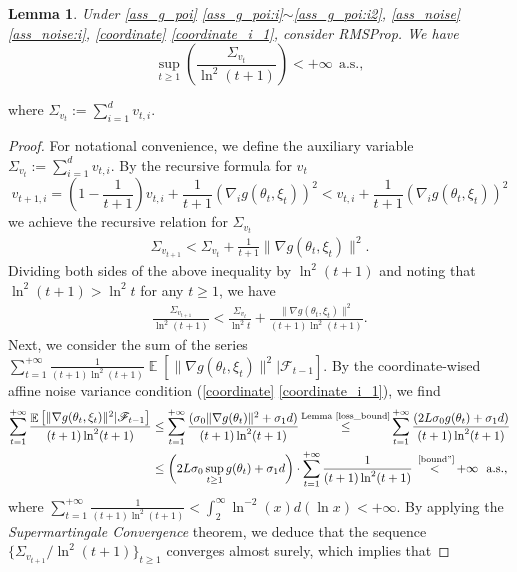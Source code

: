 \documentclass[standalone]{article}
\newtheorem{lem}{Lemma}[section]
\DeclareMathOperator{\Expect}{\mathbb{E}}
\begin{document}
\begin{lem}\label{bounded_v}
Under \cref{ass_g_poi} \ref{ass_g_poi:i}$\sim$\ref{ass_g_poi:i2}, \cref{ass_noise} \ref{ass_noise:i}, \cref{coordinate} \ref{coordinate_i_1}, consider RMSProp. We have
\[\sup_{t\ge 1}\left(\frac{\Sigma_{v_{t}}}{\ln^{2}(t+1)}\right)<+\infty\ \ \text{a.s.},\]
\end{lem}
where \(\Sigma_{v_{t}} := \sum_{i=1}^{d}v_{t,i}\).
\begin{proof}
For notational convenience, we define the auxiliary variable  \(\Sigma_{v_{t}} := \sum_{i=1}^{d}v_{t,i}\). By the recursive formula for \(v_{t}\)
\[
v_{t+1,i} = \left(1-\frac{1}{t+1}\right)v_{t,i}+\frac{1}{t+1}(\nabla_{i}g(\theta_{t},\xi_{t}))^{2} < v_{t,i}+\frac{1}{t+1}(\nabla_{i}g(\theta_{t},\xi_{t}))^{2}
\]
we achieve the recursive relation for $\Sigma_{v_{t}}$ 
\begin{align*}
    \Sigma_{v_{t+1}} <  \Sigma_{v_{t}}+\frac{1}{t+1}\|\nabla g(\theta_{t},\xi_{t})\|^{2}.
\end{align*}
Dividing both sides of the above inequality by \(\ln^{2}(t+1)\) and noting that \(\ln^{2}(t+1) > \ln^{2}t\) for any $t \geq 1$, we have
\begin{align*}
    \frac{ \Sigma_{v_{t+1}}}{\ln^{2}(t+1)} < \frac{\Sigma_{v_{t}}}{\ln^{2}t}+\frac{\|\nabla g(\theta_{t},\xi_{t})\|^{2}}{(t+1)\ln^{2}(t+1)}.
\end{align*}
Next, we consider the sum of the series $\sum_{t=1}^{+\infty}\frac{1}{(t+1)\ln^{2}(t+1)}\Expect\left[\|\nabla g(\theta_{t},\xi_{t})\|^{2}|\mathscr{F}_{t-1}\right].$
By the coordinate-wised affine noise variance condition (\cref{coordinate} \ref{coordinate_i_1}), we find
\begin{align*}
\sum_{t=1}^{+\infty}\frac{\Expect\left[\|\nabla g(\theta_{t},\xi_{t})\|^{2}|\mathscr{F}_{t-1}\right]}{(t+1)\ln^{2}(t+1)} &\le \sum_{t=1}^{+\infty}\frac{(\sigma_{0}\|\nabla g(\theta_{t})\|^{2}+\sigma_{1}d)}{(t+1)\ln^{2}(t+1)} \mathop{\le}^{\text{Lemma \ref{loss_bound}}}  \sum_{t=1}^{+\infty}\frac{(2 L\sigma_{0}g(\theta_{t})+\sigma_{1}d)}{(t+1)\ln^{2}(t+1)} \notag \\
& \le \left(2 L\sigma_{0}\sup_{t\ge 1}g(\theta_{t})+\sigma_{1}d\right)\cdot   \sum_{t=1}^{+\infty}\frac{1}{(t+1)\ln^{2}(t+1)} \mathop{<}^{\text{ \cref{bound''}}}+\infty\ \ \text{a.s.},
\end{align*}
where $\sum_{t=1}^{+\infty}\frac{1}{(t+1)\ln^{2}(t+1)} < \int_{2}^{\infty} \ln^{-2}(x)d( \ln x) < + \infty$.
By applying the \emph{Supermartingale Convergence} theorem, we deduce that the sequence \(\{\Sigma_{v_{t+1}}/\ln^{2}(t+1)\}_{t\ge 1}\) converges almost surely, which implies that

\end{proof}
\end{document}

